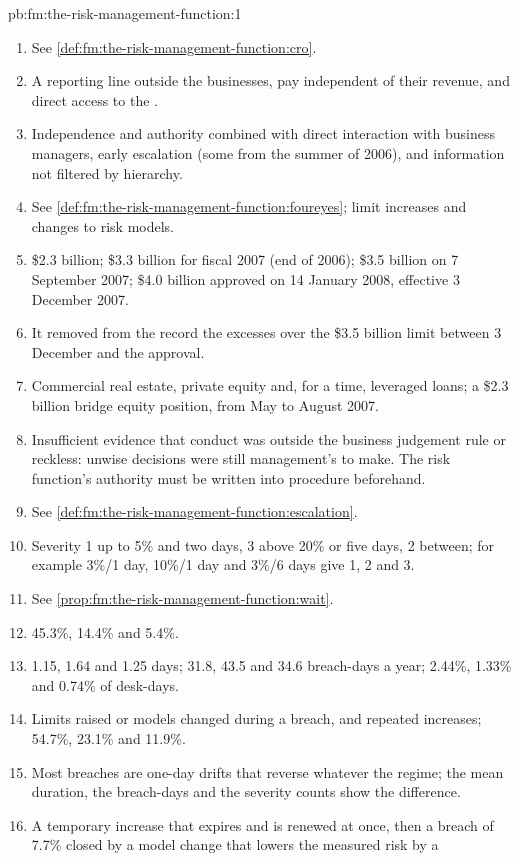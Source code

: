 \begin{solution}{pb:fm:the-risk-management-function:1}
\begin{enumerate}
\item See \cref{def:fm:the-risk-management-function:cro}.
\item A reporting line outside the businesses, pay independent of their revenue, and direct access to the .
\item Independence and authority combined with direct interaction with business managers, early escalation (some from the summer of 2006), and
information not filtered by hierarchy.
\item See \cref{def:fm:the-risk-management-function:foureyes}; limit increases and changes to risk models.
\item \$2.3 billion; \$3.3 billion for fiscal 2007 (end of 2006); \$3.5 billion on 7 September 2007; \$4.0 billion approved on 14 January 2008,
effective 3 December 2007.
\item It removed from the record the excesses over the \$3.5 billion limit between 3 December and the approval.
\item Commercial real estate, private equity and, for a time, leveraged loans; a \$2.3 billion bridge equity position, from May to August 2007.
\item Insufficient evidence that conduct was outside the business judgement rule or reckless: unwise decisions were still management's to make.
The risk function's authority must be written into procedure beforehand.
\item See \cref{def:fm:the-risk-management-function:escalation}.
\item Severity 1 up to 5\% and two days, 3 above 20\% or five days, 2 between; for example 3\%/1 day, 10\%/1 day and 3\%/6 days give 1, 2 and 3.
\item See \cref{prop:fm:the-risk-management-function:wait}.
\item 45.3\%, 14.4\% and 5.4\%.
\item 1.15, 1.64 and 1.25 days; 31.8, 43.5 and 34.6 breach-days a year; 2.44\%, 1.33\% and 0.74\% of desk-days.
\item Limits raised or models changed during a breach, and repeated increases; 54.7\%, 23.1\% and 11.9\%.
\item Most breaches are one-day drifts that reverse whatever the regime; the mean duration, the breach-days and the severity counts show the
difference.
\item A temporary increase that expires and is renewed at once, then a breach of 7.7\% closed by a model change that lowers the measured risk by a

\end{enumerate}
\end{solution}

